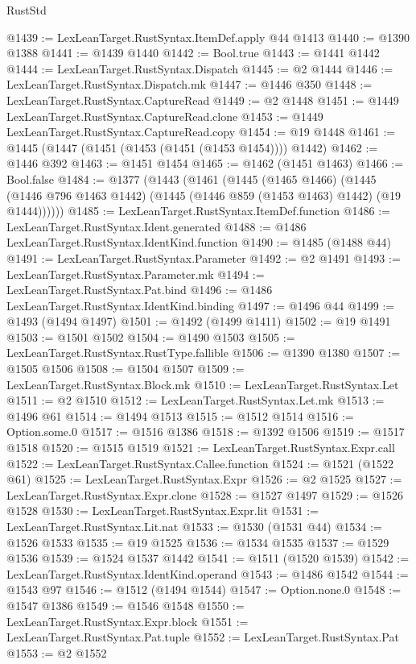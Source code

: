 \begin{lexlean}{RustStd}
\begin{coremodule}
{{@1439 := LexLeanTarget.RustSyntax.ItemDef.apply @44 @1413
@1440 := @1390 @1388
@1441 := @1439 @1440
@1442 := Bool.true
@1443 := @1441 @1442
@1444 := LexLeanTarget.RustSyntax.Dispatch
@1445 := @2 @1444
@1446 := LexLeanTarget.RustSyntax.Dispatch.mk
@1447 := @1446 @350
@1448 := LexLeanTarget.RustSyntax.CaptureRead
@1449 := @2 @1448
@1451 := @1449 LexLeanTarget.RustSyntax.CaptureRead.clone
@1453 := @1449 LexLeanTarget.RustSyntax.CaptureRead.copy
@1454 := @19 @1448
@1461 := @1445 (@1447 (@1451 (@1453 (@1451 (@1453 @1454)))) @1442)
@1462 := @1446 @392
@1463 := @1451 @1454
@1465 := @1462 (@1451 @1463)
@1466 := Bool.false
@1484 := @1377
    (@1443
      (@1461
        (@1445
          (@1465 @1466)
          (@1445 (@1446 @796 @1463 @1442) (@1445 (@1446 @859 (@1453 @1463) @1442) (@19 @1444))))))
@1485 := LexLeanTarget.RustSyntax.ItemDef.function
@1486 := LexLeanTarget.RustSyntax.Ident.generated
@1488 := @1486 LexLeanTarget.RustSyntax.IdentKind.function
@1490 := @1485 (@1488 @44)
@1491 := LexLeanTarget.RustSyntax.Parameter
@1492 := @2 @1491
@1493 := LexLeanTarget.RustSyntax.Parameter.mk
@1494 := LexLeanTarget.RustSyntax.Pat.bind
@1496 := @1486 LexLeanTarget.RustSyntax.IdentKind.binding
@1497 := @1496 @44
@1499 := @1493 (@1494 @1497)
@1501 := @1492 (@1499 @1411)
@1502 := @19 @1491
@1503 := @1501 @1502
@1504 := @1490 @1503
@1505 := LexLeanTarget.RustSyntax.RustType.fallible
@1506 := @1390 @1380
@1507 := @1505 @1506
@1508 := @1504 @1507
@1509 := LexLeanTarget.RustSyntax.Block.mk
@1510 := LexLeanTarget.RustSyntax.Let
@1511 := @2 @1510
@1512 := LexLeanTarget.RustSyntax.Let.mk
@1513 := @1496 @61
@1514 := @1494 @1513
@1515 := @1512 @1514
@1516 := Option.some.{0}
@1517 := @1516 @1386
@1518 := @1392 @1506
@1519 := @1517 @1518
@1520 := @1515 @1519
@1521 := LexLeanTarget.RustSyntax.Expr.call
@1522 := LexLeanTarget.RustSyntax.Callee.function
@1524 := @1521 (@1522 @61)
@1525 := LexLeanTarget.RustSyntax.Expr
@1526 := @2 @1525
@1527 := LexLeanTarget.RustSyntax.Expr.clone
@1528 := @1527 @1497
@1529 := @1526 @1528
@1530 := LexLeanTarget.RustSyntax.Expr.lit
@1531 := LexLeanTarget.RustSyntax.Lit.nat
@1533 := @1530 (@1531 @44)
@1534 := @1526 @1533
@1535 := @19 @1525
@1536 := @1534 @1535
@1537 := @1529 @1536
@1539 := @1524 @1537 @1442
@1541 := @1511 (@1520 @1539)
@1542 := LexLeanTarget.RustSyntax.IdentKind.operand
@1543 := @1486 @1542
@1544 := @1543 @97
@1546 := @1512 (@1494 @1544)
@1547 := Option.none.{0}
@1548 := @1547 @1386
@1549 := @1546 @1548
@1550 := LexLeanTarget.RustSyntax.Expr.block
@1551 := LexLeanTarget.RustSyntax.Pat.tuple
@1552 := LexLeanTarget.RustSyntax.Pat
@1553 := @2 @1552
}}
\end{coremodule}
\end{lexlean}
